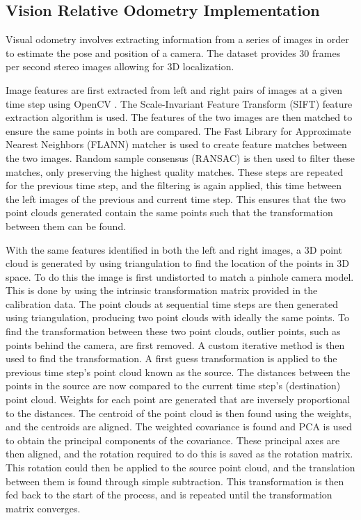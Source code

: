 \documentclass[bare_jrnl_transmag]{subfiles}
\begin{document}
\subsection{Vision Relative Odometry Implementation}

Visual odometry involves extracting information from a series of images in order to estimate the pose and position of a camera. The dataset provides 30 frames per second stereo images allowing for 3D localization. \newline 

Image features are first extracted from left and right pairs of images at a given time step using OpenCV \cite{opencv}. The Scale-Invariant Feature Transform (SIFT) feature extraction algorithm is used. The features of the two images are then matched to ensure the same points in both are compared. The Fast Library for Approximate Nearest Neighbors (FLANN) matcher is used to create feature matches between the two images.  Random sample consensus (RANSAC) is then used to filter these matches, only preserving the highest quality matches.  These steps are repeated for the previous time step, and the filtering is again applied, this time between the left images of the previous and current time step. This ensures that the two point clouds generated contain the same points such that the transformation between them can be found. \newline

With the same features identified in both the left and right images, a 3D point cloud is generated by using triangulation to find the location of the points in 3D space. To do this the image is first undistorted to match a pinhole camera model. This is done by using the intrinsic transformation matrix provided in the calibration data. The point clouds at sequential time steps are then generated using triangulation, producing two point clouds with ideally the same points. To find the transformation between these two point clouds, outlier points, such as points behind the camera, are first removed. A custom iterative method is then used to find the transformation. A first guess transformation is applied to the previous time step's point cloud known as the source. The distances between the points in the source are now compared to the current time step's (destination) point cloud. Weights for each point are generated that are inversely proportional to the distances. The centroid of the point cloud is then found using the weights, and the centroids are aligned. The weighted covariance is found and PCA is used to obtain the principal components of the covariance. These principal axes are then aligned, and the rotation required to do this is saved as the rotation matrix. This rotation could then be applied to the source point cloud, and the translation between them is found through simple subtraction. This transformation is then fed back to the start of the process, and is repeated until the transformation matrix converges. \newline
\end{document}
